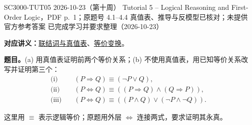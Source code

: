 \begingroup
\renewcommand{\recordid}[1]{}
\renewcommand{\relatedtopic}[2]{\hyperref[topic:#1]{#2}}
\label{tutorial:SC3000-TUT05}

\tutorialmeta
  {SC3000-TUT05}
  {2026-10-23（第十周）}
  {Tutorial 5 -- Logical Reasoning and First-Order Logic，PDF p.~1；原题号 4.1--4.4}
  {真值表、推导与反模型已核对；未提供官方参考答案}
  {已完成学习并要求整理（2026-10-23）}

\setlength{\parskip}{0.4em}

\noindent\begin{minipage}{\linewidth}
\textbf{对应讲义：}\relatedtopic{SC3000-L08-T01}{联结词与真值表}、\relatedtopic{SC3000-L08-T04}{等价变换}。

\textbf{题目。}(a) 用真值表证明前两个等价关系；(b) 不使用真值表，用已知等价关系改写并证明第三个：
\begin{align*}
\text{(i)}\quad &(P\Rightarrow Q)\equiv(\neg P\lor Q),\\
\text{(ii)}\quad &(P\Leftrightarrow Q)\equiv((P\Rightarrow Q)\land(Q\Rightarrow P)),\\
\text{(iii)}\quad &(P\Leftrightarrow Q)\equiv((P\land Q)\lor(\neg P\land\neg Q)).
\end{align*}
\end{minipage}\par
这里用 $\equiv$ 表示逻辑等价；原题用外层 $\Leftrightarrow$ 连接两式，要求证明其永真。


